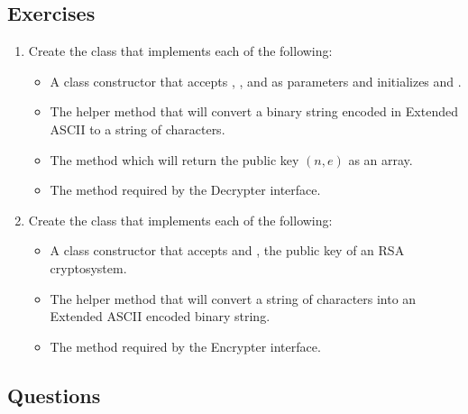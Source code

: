 		\subsection{Exercises}
			\begin{enumerate}
				\item Create the  class that implements each of the following:
					\begin{itemize}
						\item A class constructor that accepts , , and  as parameters and initializes  and .
						\item The  helper method that will convert a binary string encoded in Extended ASCII to a string of characters.
						\item The  method which will return the public key $(n, e)$ as an array.
						\item The  method required by the Decrypter interface.
					\end{itemize}
				\item Create the  class that implements each of the following:
					\begin{itemize}
						\item A class constructor that accepts  and , the public key of an RSA cryptosystem.
						\item The  helper method that will convert a string of characters into an Extended ASCII encoded binary string.
						\item The  method required by the Encrypter interface.
					\end{itemize}
			\end{enumerate}
		\subsection{Questions}
			\ \\[9pt]
	\pagebreak

